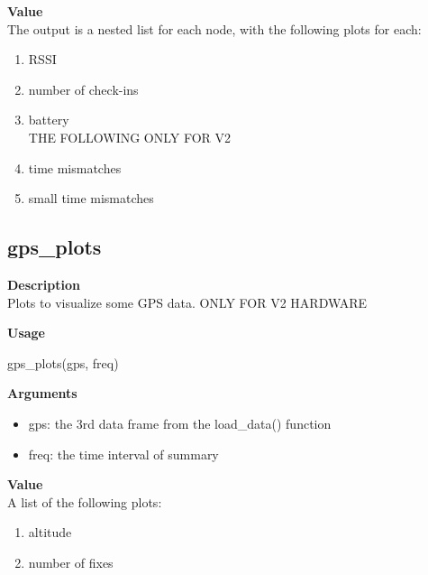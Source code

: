 \documentclass[
]{book}
\newenvironment{Shaded}{\begin{snugshade}}{\end{snugshade}}
\newcommand{\FunctionTok}[1]{\textcolor[rgb]{0.00,0.00,0.00}{#1}}
\newcommand{\NormalTok}[1]{#1}
\providecommand{\tightlist}{%
  \setlength{\itemsep}{0pt}\setlength{\parskip}{0pt}}
\begin{document}
\textbf{Value}\\
The output is a nested list for each node, with the following plots for each:

\begin{enumerate}
\def\labelenumi{\arabic{enumi}.}
\tightlist
\item
  RSSI\\
\item
  number of check-ins\\
\item
  battery\\
  THE FOLLOWING ONLY FOR V2\\
\item
  time mismatches\\
\item
  small time mismatches
\end{enumerate}

\hypertarget{gps_plots}{%
\subsection{gps\_plots}\label{gps_plots}}

\textbf{Description}\\
Plots to visualize some GPS data. ONLY FOR V2 HARDWARE

\textbf{Usage}

\begin{Shaded}
\begin{Highlighting}[]
\FunctionTok{gps\_plots}\NormalTok{(gps, freq)  }
\end{Highlighting}
\end{Shaded}

\textbf{Arguments}

\begin{itemize}
\tightlist
\item
  gps: the 3rd data frame from the load\_data() function\\
\item
  freq: the time interval of summary
\end{itemize}

\textbf{Value}\\
A list of the following plots:

\begin{enumerate}
\def\labelenumi{\arabic{enumi}.}
\tightlist
\item
  altitude\\
\item
  number of fixes
\end{enumerate}
\end{document}
